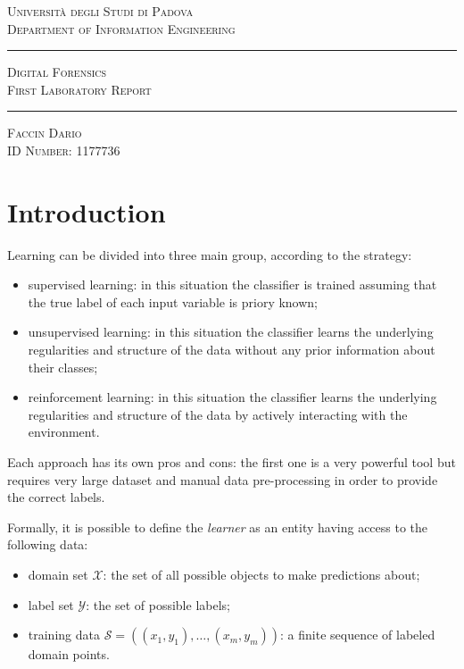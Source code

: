 \documentclass[a4paper, 11pt]{article}
\begin{document}
\begin{titlepage}

\vspace*{1cm}

\begin{center}
\large \textsc{Università degli Studi di Padova \\ Department of Information Engineering}

\vspace*{1cm}

\rule{\linewidth}{1pt} \Huge{ \textsc{Digital Forensics}} \\ {\textsc{First Laboratory Report}} \rule{\linewidth}{2pt}

\vspace*{1cm}

\large \textsc{Faccin Dario} \\
\normalsize \textsc{ID Number: 1177736}

\end{center}
\end{titlepage}

\section*{Introduction}
Learning can be divided into three main group, according to the strategy:
\begin{itemize}
	\item supervised learning: in this situation the classifier is trained assuming that the true label of each input variable is priory known;
	\item unsupervised learning: in this situation the classifier learns the underlying
	regularities and structure of the data without any prior information about their classes;
	\item reinforcement learning: in this situation the classifier learns the underlying
	regularities and structure of the data by actively interacting with the environment.
\end{itemize}

Each approach has its own pros and cons: the first one is a very powerful tool but requires very large dataset and manual data pre-processing in order to provide the correct labels. 

Formally, it is possible to define the \textit{learner} as an entity having access to the following data:
\begin{itemize}
	\item domain set $\mathcal{X}$: the set of all possible objects to make predictions about;
	\item label set $\mathcal{Y}$: the set of possible labels;
	\item training data $\mathcal{S}= \left( (x_1, y_1), \dots, (x_m, y_m) \right)$: a finite sequence of labeled domain points.
\end{itemize}
\end{document}
